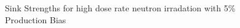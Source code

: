 \documentclass[a4paper]{article}
\begin{document}
      \begin{figure}[h!]  %
        \centering
        \qquad
        \caption{Sink Strengths for high dose rate neutron irradation with 5\% Production Bias}
        \label{figure:sink_strengths_neutron_5_1e-3}
      \end{figure}
  \newpage
\end{document}
